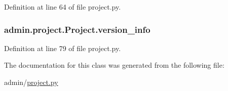 Definition at line 64 of file project.\-py.

\hypertarget{classadmin_1_1project_1_1Project_aead4e47be18c6ddbfd19d3b5aab88bda}{
\subsubsection[{version\-\_\-info}]{\setlength{\rightskip}{0pt plus 5cm}admin.\-project.\-Project.\-version\-\_\-info}}\label{classadmin_1_1project_1_1Project_aead4e47be18c6ddbfd19d3b5aab88bda}


Definition at line 79 of file project.\-py.



The documentation for this class was generated from the following file\-:\begin{DoxyCompactItemize}
\item 
admin/\hyperlink{project_8py}{project.\-py}\end{DoxyCompactItemize}
